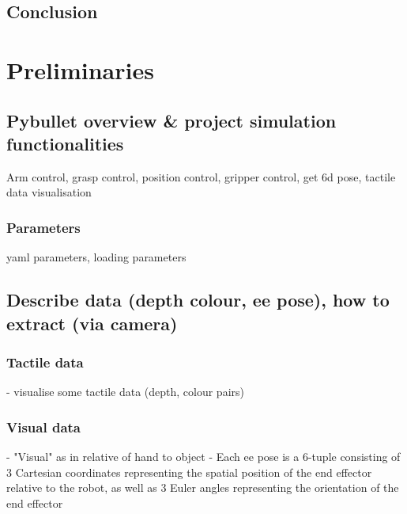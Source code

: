 \documentclass[11pt, a4paper]{report}
\begin{document}
\section{Conclusion}
\label{sec:2.4}


\chapter{Preliminaries}
\label{chap:3}


\section{Pybullet overview & project simulation functionalities}
Arm control, grasp control, position control, gripper control, get 6d pose, tactile data visualisation

\subsection{Parameters}
yaml parameters, loading parameters


\section{Describe data (depth colour, ee pose), how to extract (via camera)}


\subsection{Tactile data}
- visualise some tactile data (depth, colour pairs)


\subsection{Visual data}
- "Visual" as in relative of hand to object
- Each ee pose is a 6-tuple consisting of 3 Cartesian coordinates representing the spatial position of the end effector relative to the robot, as well as 3 Euler angles representing the orientation of the end effector

\subsection{}
\end{document}
